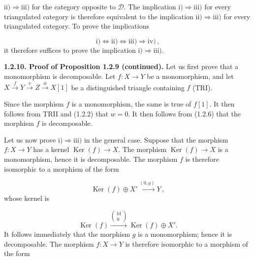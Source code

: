 \clearpage
{}%
\begingroup
\small
\setlength{\abovedisplayskip}{4pt plus 2pt minus 2pt}%
\setlength{\belowdisplayskip}{4pt plus 2pt minus 2pt}%

$\mathrm{ii)}\Longrightarrow\mathrm{iii)}$ for the category opposite to
$\mathcal D$. The implication $\mathrm{i)}\Longrightarrow\mathrm{iii)}$
for every triangulated category is therefore equivalent to the implication
$\mathrm{ii)}\Longrightarrow\mathrm{iii)}$ for every triangulated category.
To prove the implications

\[
  \mathrm{i)}\Longleftrightarrow\mathrm{ii)}
  \Longleftrightarrow\mathrm{iii)}\Longrightarrow\mathrm{iv)}\,,
\]
it therefore suffices to prove the implication
$\mathrm{i)}\Longrightarrow\mathrm{iii)}$.

\medskip
\noindent\textbf{1.2.10. Proof of Proposition 1.2.9 (continued).}
Let us first prove that a monomorphism is decomposable. Let
$f\colon X\longrightarrow Y$ be a monomorphism, and let
$X\xrightarrow{f}Y\xrightarrow{v}Z\xrightarrow{w}X[1]$ be a distinguished
triangle containing $f$ (TRI).

Since the morphism $f$ is a monomorphism, the same is true of $f[1]$. It
then follows from TRII and (1.2.2) that $w=0$. It then follows from (1.2.6)
that the morphism $f$ is decomposable.

Let us now prove $\mathrm{i)}\Longrightarrow\mathrm{iii)}$ in the general
case. Suppose that the morphism $f\colon X\longrightarrow Y$ has a kernel
$\operatorname{Ker}(f)\longrightarrow X$. The morphism
$\operatorname{Ker}(f)\longrightarrow X$ is a monomorphism, hence it is
decomposable. The morphism $f$ is therefore isomorphic to a morphism of the
form

\[
  \operatorname{Ker}(f)\oplus X'
  \xrightarrow{(0,g)}Y\,,
\]
whose kernel is

\[
  \operatorname{Ker}(f)
  \xrightarrow{\left(\begin{smallmatrix}\operatorname{id}\\0\end{smallmatrix}\right)}
  \operatorname{Ker}(f)\oplus X'.
\]
It follows immediately that the morphism $g$ is a monomorphism; hence it is
decomposable. The morphism $f\colon X\longrightarrow Y$ is therefore
isomorphic to a morphism of the form


